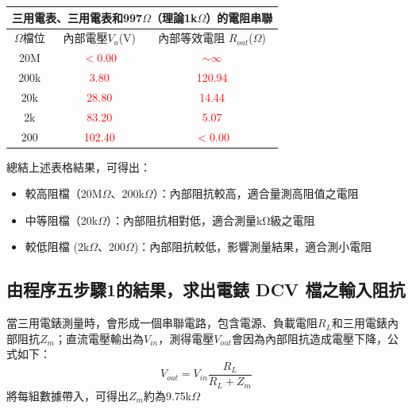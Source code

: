 \documentclass[12pt,a4paper]{article}
\begin{document}
\begin{CJK}{UTF8}{bkai}
\begin{center}
    \begin{tabular}{c|c|c}
    \multicolumn{3}{c}{三用電表、三用電表和997$\Omega$（理論1k$\Omega$）的電阻串聯}\\
    \hline
    \hline
    $\Omega$檔位  &  內部電壓$V_{a}$(V)   &   內部等效電阻
    $R_{out}$($\Omega$)\\
    \hline
    \hline
    20M &   \textcolor{red}{$<$0.00}    &   \textcolor{red}{$\sim\infty$}\\\hline
    200k    &   \textcolor{red}{3.80}    &   \textcolor{red}{120.94}\\\hline
    20k    &   \textcolor{red}{28.80}    &   \textcolor{red}{14.44}\\\hline
    2k    &   \textcolor{red}{83.20}    &   \textcolor{red}{5.07}\\\hline
    200    &   \textcolor{red}{102.40}    &   \textcolor{red}{$<$0.00}\\\hline
    \end{tabular}
\end{center}

總結上述表格結果，可得出：
\begin{itemize}
    \item 較高阻檔（20M$\Omega$、200k$\Omega$）：內部阻抗較高，適合量測高阻值之電阻
    \item 中等阻檔（20k$\Omega$）：內部阻抗相對低，適合測量kΩ級之電阻
    \item 較低阻檔 (2k$\Omega$、200$\Omega$)：內部阻抗較低，影響測量結果，適合測小電阻
\end{itemize}

\subsection{由程序五步驟1的結果，求出電錶 DCV 檔之輸入阻抗}\label{subsec:5}
\hfill

當三用電錶測量時，會形成一個串聯電路，包含電源、負載電阻$R_{L}$和三用電錶內部阻抗$Z_{m}$；直流電壓輸出為$V_{in}$，測得電壓$V_{out}$會因為內部阻抗造成電壓下降，公式如下：
\begin{equation}
    V_{out} = V_{in} \frac{R_{L}}{R_{L}+Z_{m}}
\end{equation}
將每組數據帶入，可得出$Z_{m}$約為9.75k$\Omega$




\end{CJK}
\end{document}
